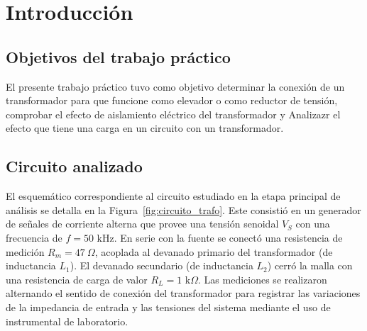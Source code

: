 \section{Introducción}

\subsection{Objetivos del trabajo práctico}
El presente trabajo práctico tuvo como objetivo determinar la conexión de un transformador para que funcione como elevador o como reductor de tensión, comprobar el efecto de aislamiento eléctrico del transformador y Analizazr el efecto que tiene una carga en un circuito con un transformador.

\subsection{Circuito analizado}
El esquemático correspondiente al circuito estudiado en la etapa principal de análisis se detalla en la Figura~\ref{fig:circuito_trafo}. Este consistió en un generador de señales de corriente alterna que provee una tensión senoidal $V_S$ con una frecuencia de $f = 50\text{ kHz}$. En serie con la fuente se conectó una resistencia de medición $R_m = 47\ \Omega$, acoplada al devanado primario del transformador (de inductancia $L_1$). El devanado secundario (de inductancia $L_2$) cerró la malla con una resistencia de carga de valor $R_L = 1\text{ k}\Omega$. Las mediciones se realizaron alternando el sentido de conexión del transformador para registrar las variaciones de la impedancia de entrada y las tensiones del sistema mediante el uso de instrumental de laboratorio.

